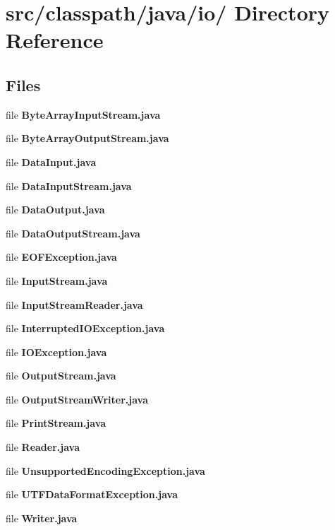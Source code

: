 \section{src/classpath/java/io/ Directory Reference}
\label{dir_ca2e44b005ccd29039c765174eccfdc5}
\subsection*{Files}
\begin{DoxyCompactItemize}
\item 
file {\bfseries ByteArrayInputStream.java}
\item 
file {\bfseries ByteArrayOutputStream.java}
\item 
file {\bfseries DataInput.java}
\item 
file {\bfseries DataInputStream.java}
\item 
file {\bfseries DataOutput.java}
\item 
file {\bfseries DataOutputStream.java}
\item 
file {\bfseries EOFException.java}
\item 
file {\bfseries InputStream.java}
\item 
file {\bfseries InputStreamReader.java}
\item 
file {\bfseries InterruptedIOException.java}
\item 
file {\bfseries IOException.java}
\item 
file {\bfseries OutputStream.java}
\item 
file {\bfseries OutputStreamWriter.java}
\item 
file {\bfseries PrintStream.java}
\item 
file {\bfseries Reader.java}
\item 
file {\bfseries UnsupportedEncodingException.java}
\item 
file {\bfseries UTFDataFormatException.java}
\item 
file {\bfseries Writer.java}
\end{DoxyCompactItemize}
